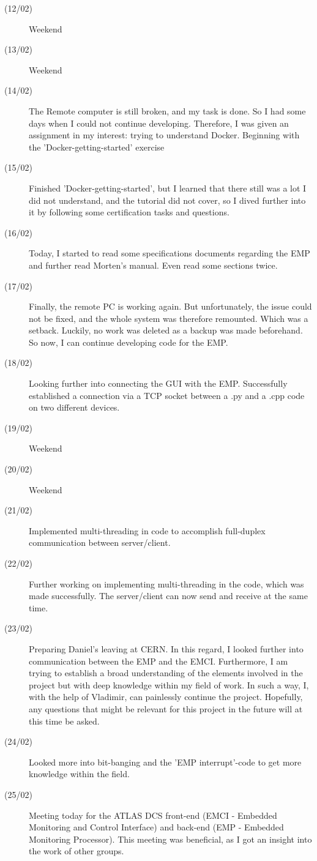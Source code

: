 \begin{description}
\item[(12/02)] Weekend
\item[(13/02)] Weekend
\item[(14/02)] The Remote computer is still broken, and my task is done. So I had some days when I could not continue developing. Therefore, I was given an assignment in my interest: trying to understand Docker. Beginning with the 'Docker-getting-started' exercise
\item[(15/02)] Finished 'Docker-getting-started', but I learned that there still was a lot I did not understand, and the tutorial did not cover, so I dived further into it by following some certification tasks and questions.
\item[(16/02)] Today, I started to read some specifications documents regarding the EMP and further read Morten's manual. Even read some sections twice. 
\item[(17/02)] Finally, the remote PC is working again. But unfortunately, the issue could not be fixed, and the whole system was therefore remounted. Which was a setback. Luckily, no work was deleted as a backup was made beforehand. So now, I can continue developing code for the EMP.
\item[(18/02)] Looking further into connecting the GUI with the EMP. Successfully established a connection via a TCP socket between a .py and a .cpp code on two different devices.  
\item[(19/02)] Weekend
\item[(20/02)] Weekend
\item[(21/02)] Implemented multi-threading in code to accomplish full-duplex communication between server/client.
\item[(22/02)] Further working on implementing multi-threading in the code, which was made successfully. The server/client can now send and receive at the same time.  
\item[(23/02)] Preparing Daniel's leaving at CERN. In this regard, I looked further into communication between the EMP and the EMCI. Furthermore, I am trying to establish a broad understanding of the elements involved in the project but with deep knowledge within my field of work. In such a way, I, with the help of Vladimir, can painlessly continue the project. Hopefully, any questions that might be relevant for this project in the future will at this time be asked.  
\item[(24/02)] Looked more into bit-banging and the 'EMP interrupt'-code to get more knowledge within the field. 
\item[(25/02)] Meeting today for the ATLAS DCS front-end (EMCI - Embedded Monitoring and Control Interface) and back-end (EMP - Embedded Monitoring Processor). This meeting was beneficial, as I got an insight into the work of other groups. 

\end{description}
